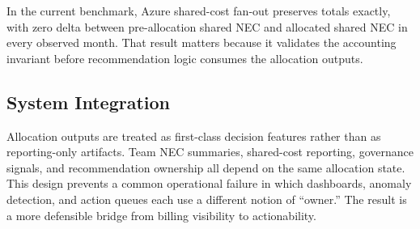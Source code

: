 In the current benchmark, Azure shared-cost fan-out preserves totals exactly, with zero delta between pre-allocation shared NEC and allocated shared NEC in every observed month. That result matters because it validates the accounting invariant before recommendation logic consumes the allocation outputs.

\subsection{System Integration}
Allocation outputs are treated as first-class decision features rather than as reporting-only artifacts. Team NEC summaries, shared-cost reporting, governance signals, and recommendation ownership all depend on the same allocation state. This design prevents a common operational failure in which dashboards, anomaly detection, and action queues each use a different notion of ``owner.'' The result is a more defensible bridge from billing visibility to actionability.
